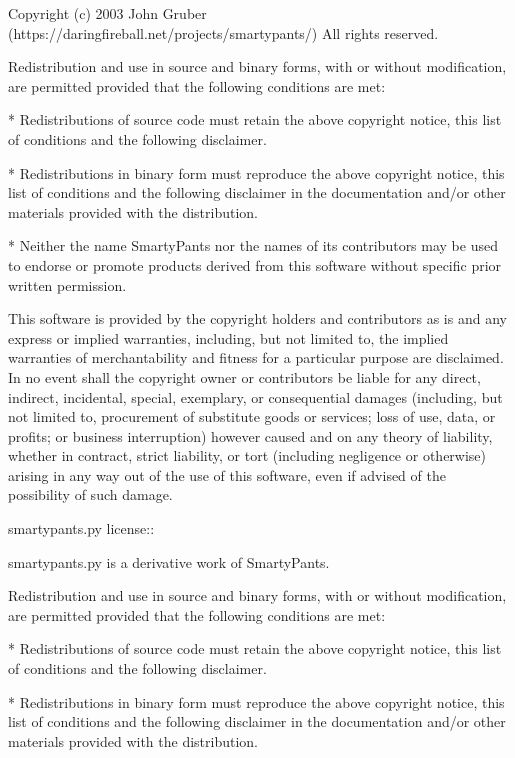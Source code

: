 \documentclass[letterpaper,10pt,english]{sphinxmanual}
\begin{document}
\begin{sphinxVerbatim}[commandchars=\\\{\}]
    Copyright (c) 2003 John Gruber
    (https://daringfireball.net/projects/smartypants/)
    All rights reserved.

    Redistribution and use in source and binary forms, with or without
    modification, are permitted provided that the following conditions
    are met:

    *   Redistributions of source code must retain the above copyright
        notice, this list of conditions and the following disclaimer.

    *   Redistributions in binary form must reproduce the above
        copyright notice, this list of conditions and the following
        disclaimer in the documentation and/or other materials
        provided with the distribution.

    *   Neither the name \PYGZdq{}SmartyPants\PYGZdq{} nor the names of its
        contributors may be used to endorse or promote products
        derived from this software without specific prior written
        permission.

    This software is provided by the copyright holders and
    contributors \PYGZdq{}as is\PYGZdq{} and any express or implied warranties,
    including, but not limited to, the implied warranties of
    merchantability and fitness for a particular purpose are
    disclaimed. In no event shall the copyright owner or contributors
    be liable for any direct, indirect, incidental, special,
    exemplary, or consequential damages (including, but not limited
    to, procurement of substitute goods or services; loss of use,
    data, or profits; or business interruption) however caused and on
    any theory of liability, whether in contract, strict liability, or
    tort (including negligence or otherwise) arising in any way out of
    the use of this software, even if advised of the possibility of
    such damage.


smartypants.py license::

    smartypants.py is a derivative work of SmartyPants.

    Redistribution and use in source and binary forms, with or without
    modification, are permitted provided that the following conditions
    are met:

    *   Redistributions of source code must retain the above copyright
        notice, this list of conditions and the following disclaimer.

    *   Redistributions in binary form must reproduce the above
        copyright notice, this list of conditions and the following
        disclaimer in the documentation and/or other materials
        provided with the distribution.


\end{sphinxVerbatim}
\end{document}
